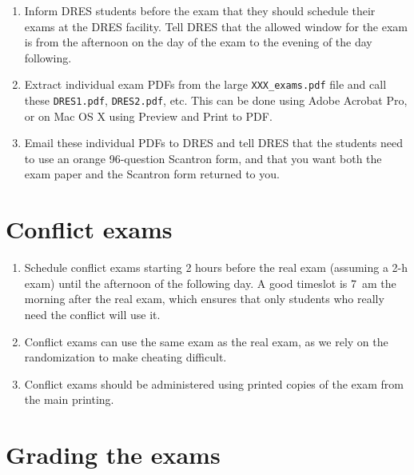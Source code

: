 \documentclass{article}
\begin{document}
\begin{enumerate}
\item Inform DRES students before the exam that they should schedule
  their exams at the DRES facility. Tell DRES that the allowed window
  for the exam is from the afternoon on the day of the exam to the
  evening of the day following.
\item Extract individual exam PDFs from the large
  \texttt{XXX_exams.pdf} file and call these \texttt{DRES1.pdf},
  \texttt{DRES2.pdf}, etc. This can be done using Adobe Acrobat Pro,
  or on Mac OS X using Preview and Print to PDF.
\item Email these individual PDFs to DRES and tell DRES that the
  students need to use an orange 96-question Scantron form, and that
  you want both the exam paper and the Scantron form returned to you.
\end{enumerate}

\section{Conflict exams}

\begin{enumerate}
\item Schedule conflict exams starting 2 hours before the real exam
  (assuming a 2-h exam) until the afternoon of the following day. A
  good timeslot is 7~am the morning after the real exam, which ensures
  that only students who really need the conflict will use it.
\item Conflict exams can use the same exam as the real exam, as we
  rely on the randomization to make cheating difficult.
\item Conflict exams should be administered using printed copies of
  the exam from the main printing.
\end{enumerate}

\section{Grading the exams}
\end{document}

